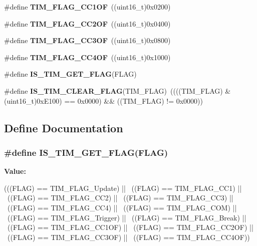 \begin{DoxyCompactItemize}
\item 
\hypertarget{group__TIM__Flags_ga38dfb7d1ed00af77d70bc3be28500108}{
\#define {\bfseries TIM\_\-FLAG\_\-CC1OF}~((uint16\_\-t)0x0200)}
\label{group__TIM__Flags_ga38dfb7d1ed00af77d70bc3be28500108}

\item 
\hypertarget{group__TIM__Flags_ga4df0c71d3e695c214d49802942e04590}{
\#define {\bfseries TIM\_\-FLAG\_\-CC2OF}~((uint16\_\-t)0x0400)}
\label{group__TIM__Flags_ga4df0c71d3e695c214d49802942e04590}

\item 
\hypertarget{group__TIM__Flags_gac81f24eaffdf83c2db9d2e6078a00919}{
\#define {\bfseries TIM\_\-FLAG\_\-CC3OF}~((uint16\_\-t)0x0800)}
\label{group__TIM__Flags_gac81f24eaffdf83c2db9d2e6078a00919}

\item 
\hypertarget{group__TIM__Flags_gafc8b04654766d98ba2c6fed601895a20}{
\#define {\bfseries TIM\_\-FLAG\_\-CC4OF}~((uint16\_\-t)0x1000)}
\label{group__TIM__Flags_gafc8b04654766d98ba2c6fed601895a20}

\item 
\#define {\bfseries IS\_\-TIM\_\-GET\_\-FLAG}(FLAG)
\item 
\hypertarget{group__TIM__Flags_gae60a1b5900de8354b2a4f017b2bd4f94}{
\#define {\bfseries IS\_\-TIM\_\-CLEAR\_\-FLAG}(TIM\_\-FLAG)~((((TIM\_\-FLAG) \& (uint16\_\-t)0xE100) == 0x0000) \&\& ((TIM\_\-FLAG) != 0x0000))}
\label{group__TIM__Flags_gae60a1b5900de8354b2a4f017b2bd4f94}

\end{DoxyCompactItemize}


\subsection{Define Documentation}
\hypertarget{group__TIM__Flags_ga6406de8131ae53ee29740c3e8627b098}{
\subsubsection[{IS\_\-TIM\_\-GET\_\-FLAG}]{\setlength{\rightskip}{0pt plus 5cm}\#define IS\_\-TIM\_\-GET\_\-FLAG(FLAG)}}
\label{group__TIM__Flags_ga6406de8131ae53ee29740c3e8627b098}
{\bfseries Value:}
\begin{DoxyCode}
(((FLAG) == TIM_FLAG_Update) || \
                               ((FLAG) == TIM_FLAG_CC1) || \
                               ((FLAG) == TIM_FLAG_CC2) || \
                               ((FLAG) == TIM_FLAG_CC3) || \
                               ((FLAG) == TIM_FLAG_CC4) || \
                               ((FLAG) == TIM_FLAG_COM) || \
                               ((FLAG) == TIM_FLAG_Trigger) || \
                               ((FLAG) == TIM_FLAG_Break) || \
                               ((FLAG) == TIM_FLAG_CC1OF) || \
                               ((FLAG) == TIM_FLAG_CC2OF) || \
                               ((FLAG) == TIM_FLAG_CC3OF) || \
                               ((FLAG) == TIM_FLAG_CC4OF))
\end{DoxyCode}
